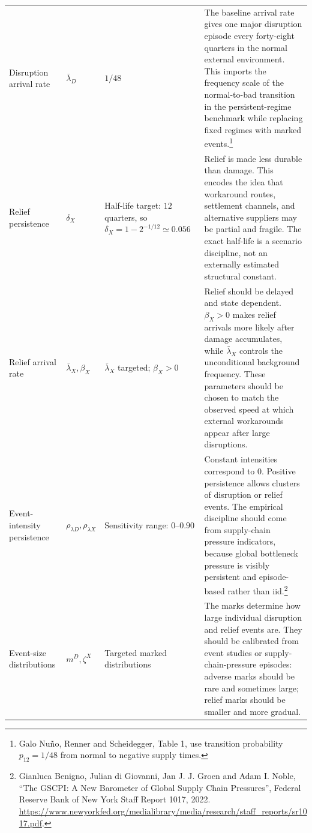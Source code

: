 ﻿\documentclass[12pt]{article}
\theoremstyle{remark}
\begin{document}
\begin{longtable}{
>{\raggedright\arraybackslash}p{}
>{\raggedright\arraybackslash}p{}
>{\raggedright\arraybackslash}p{}
>{\raggedright\arraybackslash}p{}}
Disruption arrival rate
&
$\bar\lambda_D$
&
$1/48$
&
The baseline arrival rate gives one major disruption episode every forty-eight quarters in the
normal external environment. This imports the frequency scale of the normal-to-bad transition in
the persistent-regime benchmark while replacing fixed regimes with marked events.\footnote{Galo
Nu\~no, Renner and Scheidegger, Table 1, use transition probability $p_{12}=1/48$ from normal to
negative supply times.}
\\

Relief persistence
&
$\delta_X$
&
Half-life target: $12$ quarters, so $\delta_X=1-2^{-1/12}\simeq0.056$
&
Relief is made less durable than damage. This encodes the idea that workaround routes, settlement
channels, and alternative suppliers may be partial and fragile. The exact half-life is a scenario
discipline, not an externally estimated structural constant.
\\

Relief arrival rate
&
$\bar\lambda_X,\beta_X$
&
$\bar\lambda_X$ targeted; $\beta_X>0$
&
Relief should be delayed and state dependent. $\beta_X>0$ makes relief arrivals more likely after
damage accumulates, while $\bar\lambda_X$ controls the unconditional background frequency. These
parameters should be chosen to match the observed speed at which external workarounds appear after
large disruptions.
\\

Event-intensity persistence
&
$\rho_{\lambda D},\rho_{\lambda X}$
&
Sensitivity range: $0$--$0.90$
&
Constant intensities correspond to $0$. Positive persistence allows clusters of disruption or
relief events. The empirical discipline should come from supply-chain pressure indicators, because
global bottleneck pressure is visibly persistent and episode-based rather than iid.\footnote{Gianluca
Benigno, Julian di Giovanni, Jan J. J. Groen and Adam I. Noble, ``The GSCPI: A New Barometer of
Global Supply Chain Pressures'', Federal Reserve Bank of New York Staff Report 1017, 2022.
\url{https://www.newyorkfed.org/medialibrary/media/research/staff_reports/sr1017.pdf}.}
\\

Event-size distributions
&
$m^D,\zeta^X$
&
Targeted marked distributions
&
The marks determine how large individual disruption and relief events are. They should be
calibrated from event studies or supply-chain-pressure episodes: adverse marks should be rare and
sometimes large; relief marks should be smaller and more gradual.
\\


\end{longtable}
\end{document}
